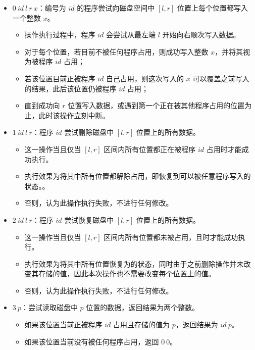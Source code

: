 \begin{itemize}
    \item $0\ id\ l\ r\ x$：编号为 $id$ 的程序尝试向磁盘空间中 $[l,r]$ 位置上每个位置都写入一个整数 $x$。
    \begin{itemize}
        \item 操作执行过程中，程序 $id$ 会尝试从最左端 $l$ 开始向右顺次写入数据。
        \item 对于每个位置，若目前不被任何程序占用，则成功写入整数 $x$，并将其视为被程序 $id$ 占用；
        \item 若该位置目前正被程序 $id$ 自己占用，则这次写入的 $x$ 可以覆盖之前写入的结果，此后该位置仍被程序 $id$ 占用；
        \item 直到成功向 $r$ 位置写入数据，或遇到第一个正在被其他程序占用的位置为止，此时该操作立刻中断。
    \end{itemize}
    \item $1\ id\ l\ r$：程序 $id$ 尝试删除磁盘中 $[l,r]$ 位置上的所有数据。
    \begin{itemize}
        \item 这一操作当且仅当 $[l,r]$ 区间内所有位置都正在被程序 $id$ 占用时才能成功执行。
        \item 执行效果为将其中所有位置都解除占用，即恢复到可以被任意程序写入的状态。{}。
        \item 否则，认为此操作执行失败，不进行任何修改。
    \end{itemize}
    \item $2\ id\ l\ r$：程序 $id$ 尝试恢复磁盘中 $[l,r]$ 位置上的所有数据。
    \begin{itemize}
        \item 这一操作当且仅当 $[l,r]$ 区间内所有位置都未被占用，且{}时才能成功执行。
        \item 执行效果为将其中所有位置恢复为{}的状态，同时由于之前删除操作并未改变其存储的值，因此本次操作也不需要改变每个位置上的值。
        \item 否则，认为此操作执行失败，不进行任何修改。
    \end{itemize}
    \item $3\ p$：尝试读取磁盘中 $p$ 位置的数据，返回结果为两个整数。
    \begin{itemize}
        \item 如果该位置当前正被程序 $id$ 占用且存储的值为 $p$，返回结果为 $id\ p$。
        \item 如果该位置当前没有被任何程序占用，返回 $0\ 0$。
    \end{itemize}
\end{itemize}

